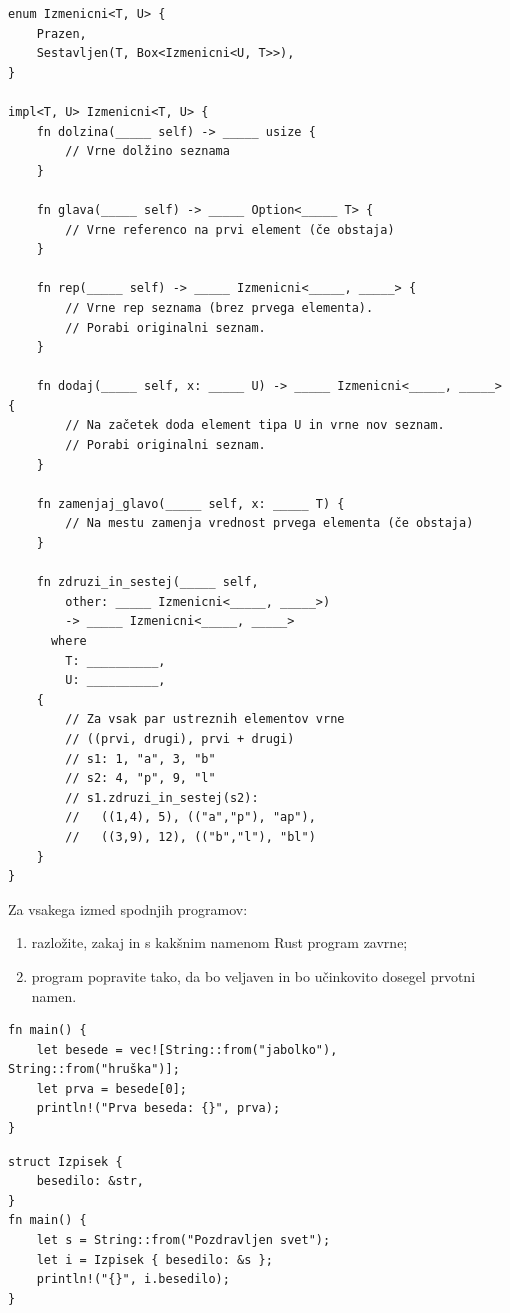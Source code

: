 \documentclass[11pt]{../izpit}
\begin{document}
{\large
\begin{verbatim}
enum Izmenicni<T, U> {
    Prazen,
    Sestavljen(T, Box<Izmenicni<U, T>>),
}

impl<T, U> Izmenicni<T, U> {
    fn dolzina(_____ self) -> _____ usize {
        // Vrne dolžino seznama
    }

    fn glava(_____ self) -> _____ Option<_____ T> {
        // Vrne referenco na prvi element (če obstaja)
    }

    fn rep(_____ self) -> _____ Izmenicni<_____, _____> {
        // Vrne rep seznama (brez prvega elementa).
        // Porabi originalni seznam.
    }

    fn dodaj(_____ self, x: _____ U) -> _____ Izmenicni<_____, _____> {
        // Na začetek doda element tipa U in vrne nov seznam.
        // Porabi originalni seznam.
    }

    fn zamenjaj_glavo(_____ self, x: _____ T) {
        // Na mestu zamenja vrednost prvega elementa (če obstaja)
    }

    fn zdruzi_in_sestej(_____ self,
        other: _____ Izmenicni<_____, _____>)
        -> _____ Izmenicni<_____, _____>
      where
        T: __________,
        U: __________,
    {
        // Za vsak par ustreznih elementov vrne
        // ((prvi, drugi), prvi + drugi)
        // s1: 1, "a", 3, "b"
        // s2: 4, "p", 9, "l"
        // s1.zdruzi_in_sestej(s2):
        //   ((1,4), 5), (("a","p"), "ap"),
        //   ((3,9), 12), (("b","l"), "bl")
    }
}
\end{verbatim}
}



\naloga[\tocke{20}]
Za vsakega izmed spodnjih programov:
\begin{enumerate}
  \item razložite, zakaj in s kakšnim namenom Rust program zavrne;
  \item program popravite tako, da bo veljaven in bo učinkovito dosegel prvotni namen.
\end{enumerate}

\podnaloga
\begin{verbatim}
fn main() {
    let besede = vec![String::from("jabolko"), String::from("hruška")];
    let prva = besede[0];
    println!("Prva beseda: {}", prva);
}
\end{verbatim}

\podnaloga
\begin{verbatim}
struct Izpisek {
    besedilo: &str,
}
fn main() {
    let s = String::from("Pozdravljen svet");
    let i = Izpisek { besedilo: &s };
    println!("{}", i.besedilo);
}
\end{verbatim}
\end{document}
